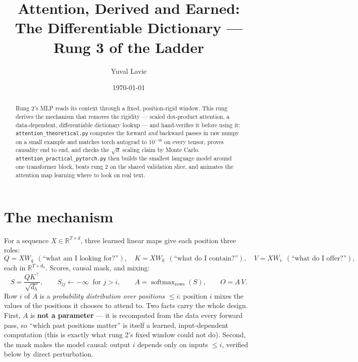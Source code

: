 \documentclass[11pt]{article}
\title{Attention, Derived and Earned:\\
The Differentiable Dictionary --- Rung 3 of the Ladder}
\author{Yuval Lavie}
\date{\today}
\newcommand{\smax}{\operatorname{softmax}}
\begin{document}
\maketitle

\begin{abstract}
Rung 2's MLP reads its context through a fixed, position-rigid window.
This rung derives the mechanism that removes the rigidity ---
scaled dot-product attention, a data-dependent, differentiable
dictionary lookup --- and hand-verifies it before using it:
\texttt{attention\_theoretical.py} computes the forward \emph{and}
backward passes in raw numpy on a small example and matches torch
autograd to $10^{-16}$ on every tensor, proves causality end to end,
and checks the $\sqrt{d}$ scaling claim by Monte Carlo.
\texttt{attention\_practical\_pytorch.py} then builds the smallest
language model around one transformer block, beats rung 2 on the
shared validation slice, and animates the attention map learning where
to look on real text.
\end{abstract}

\section{The mechanism}

For a sequence $X \in \mathbb{R}^{T \times d}$, three learned linear
maps give each position three roles:
\begin{equation}
  Q = X W_q \ \ (\text{``what am I looking for?''}), \quad
  K = X W_k \ \ (\text{``what do I contain?''}), \quad
  V = X W_v \ \ (\text{``what do I offer?''}),
  \label{eq:qkv}
\end{equation}
each in $\mathbb{R}^{T \times d_h}$. Scores, causal mask, and mixing:
\begin{equation}
  S = \frac{Q K^{\!\top}}{\sqrt{d_h}}, \qquad
  S_{ij} \leftarrow -\infty \ \text{ for } j > i, \qquad
  A = \smax_{\text{rows}}(S), \qquad
  O = A\,V.
  \label{eq:attn}
\end{equation}
Row $i$ of $A$ is a \emph{probability distribution over positions
$\le i$}: position $i$ mixes the values of the positions it chooses to
attend to. Two facts carry the whole design. First, $A$ is
\textbf{not a parameter} --- it is recomputed from the data every
forward pass, so ``which past positions matter'' is itself a learned,
input-dependent computation (this is exactly what rung 2's fixed
window could not do). Second, the mask makes the model causal:
output $i$ depends only on inputs $\le i$, verified below by direct
perturbation.
\end{document}
